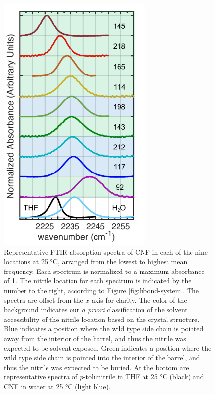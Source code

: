 \begin{figure}
    \center
    \includegraphics[width=3.00in]{figures-gfp-hbond/spectra_colors.pdf}
    \caption{Representative FTIR absorption spectra of CNF in each of the nine locations at 25 \si{\celsius}, arranged from the lowest to highest mean frequency. Each spectrum is normalized to a maximum absorbance of 1. The nitrile location for each spectrum is indicated by the number to the right, according to Figure \ref{fig:hbond-system}. The spectra are offset from the $x$-axis for clarity. The color of the background indicates our \emph{a priori} classification of the solvent accessibility of the nitrile location based on the crystal structure. Blue indicates a position where the wild type side chain is pointed away from the interior of the barrel, and thus the nitrile was expected to be solvent exposed. Green indicates a position where the wild type side chain is pointed into the interior of the barrel, and thus the nitrile was expected to be buried. At the bottom are representative spectra of \emph{p}-tolunitrile in THF at 25 \si{\celsius} (black) and CNF in water at 25 \si{\celsius} (light blue).}
    \label{fig:hbond-spectra}
\end{figure}

